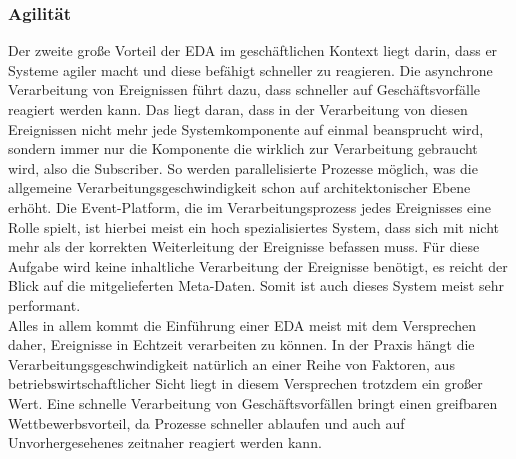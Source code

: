 \subsubsection*{Agilität}
Der zweite große Vorteil der \ac{EDA} im geschäftlichen Kontext liegt darin, dass er Systeme agiler macht und diese befähigt schneller zu reagieren. Die asynchrone Verarbeitung von Ereignissen führt dazu, dass schneller auf Geschäftsvorfälle reagiert werden kann. Das liegt daran, dass in der Verarbeitung von diesen Ereignissen nicht mehr jede Systemkomponente auf einmal beansprucht wird, sondern immer nur die Komponente die wirklich zur Verarbeitung gebraucht wird, also die Subscriber. So werden parallelisierte Prozesse möglich, was die allgemeine Verarbeitungsgeschwindigkeit schon auf architektonischer Ebene erhöht. Die Event-Platform, die im Verarbeitungsprozess jedes Ereignisses eine Rolle spielt, ist hierbei meist ein hoch spezialisiertes System, dass sich mit nicht mehr als der korrekten Weiterleitung der Ereignisse befassen muss. Für diese Aufgabe wird keine inhaltliche Verarbeitung der Ereignisse benötigt, es reicht der Blick auf die mitgelieferten Meta-Daten. Somit ist auch dieses System meist sehr performant. \\
Alles in allem kommt die Einführung einer \ac{EDA} meist mit dem Versprechen daher, Ereignisse in Echtzeit verarbeiten zu können. In der Praxis hängt die Verarbeitungsgeschwindigkeit natürlich an einer Reihe von Faktoren, aus betriebswirtschaftlicher Sicht liegt in diesem Versprechen trotzdem ein großer Wert. Eine schnelle Verarbeitung von Geschäftsvorfällen bringt einen greifbaren Wettbewerbsvorteil, da Prozesse schneller ablaufen und auch auf Unvorhergesehenes zeitnaher reagiert werden kann.
